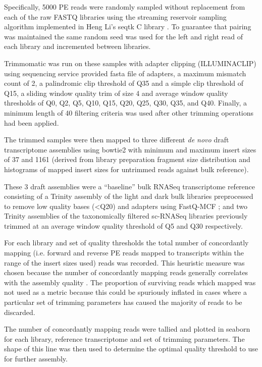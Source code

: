 Specifically, 5000 PE reads were randomly sampled without replacement from each of the raw FASTQ libraries 
using the streaming reservoir sampling \citep{Vitter1985} algorithm implemented in Heng Li's 
seqtk C library \citep{SeqtkGitHub}.
To guarantee that pairing was maintained the same random seed was used for the left and right read
of each library and incremented between libraries.

Trimmomatic \citep{Bolger2014a} was run on these samples with adapter clipping (ILLUMINACLIP)
using sequencing service provided fasta file of adapters, a maximum mismatch count of 2,
a palindromic clip threshold of Q35 and a simple clip threshold of Q15, a sliding window
quality trim of size 4 and average window quality thresholds of Q0, Q2, Q5, Q10, Q15, Q20, Q25, Q30, Q35, and Q40.
Finally, a minimum length of \SI{40}{\bp} filtering criteria was used after other trimming operations had been applied.


The trimmed samples were then mapped to three different \textit{de novo} draft transcriptome assemblies using bowtie2
\citep{Langmead2012} with minimum and maximum insert sizes of \SI{37}{\bp} and \SI{1161}{\bp} (derived from library preparation
fragment size distribution and histograms of mapped insert sizes for untrimmed reads against bulk reference).

These 3 draft assemblies were a ``baseline'' bulk RNASeq transcriptome reference consisting of a Trinity \citep{Haas2013} 
assembly of the light and dark bulk libraries preprocessed to remove low quality bases (<Q20) and adapters using FastQ-MCF \citep{Aronesty2013};
and two Trinity assemblies of the taxonomically filtered sc-RNASeq libraries previously trimmed 
at an average window quality threshold of Q5 and Q30 respectively.


For each library and set of quality thresholds the total number of concordantly
mapping (i.e. forward and reverse PE reads mapped to transcripts within the range of the insert sizes used)
reads was recorded.  This heuristic measure was chosen because the number of concordantly mapping reads generally correlates
with the assembly quality \citep{Macmanes2014}. The proportion of surviving reads which mapped 
was not used as a metric because this could be spuriously inflated in cases where a particular
set of trimming parameters has caused the majority of reads to be discarded.

The number of concordantly mapping reads were tallied and plotted in seaborn 
for each library, reference transcriptome and set of trimming parameters.
The shape of this line was then used to determine the optimal quality 
threshold to use for further assembly.

